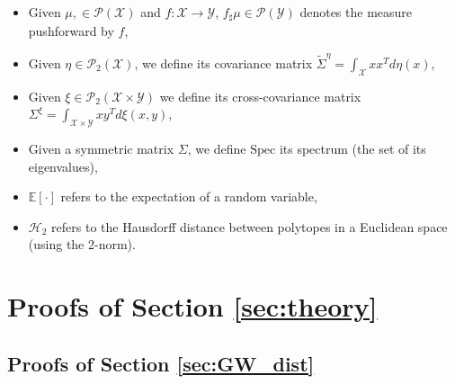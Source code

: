 \documentclass{article}
\newcommand{\Y}{\mathcal{Y}}
\newcommand{\X}{\mathcal{X}}
\newcommand{\1}{\mathbf{1}}
\renewcommand{\P}{\mathcal{P}}
\theoremstyle{definition}
\theoremstyle{remark}
\begin{document}
\begin{appendices}
\begin{itemize}
    \item Given $\mu,\in\P(\X)$ and $f:\X\to\Y$, $f_\sharp\mu\in \P(\Y)$ denotes the measure pushforward by $f$,
    \item Given $\eta\in \P_2(\X)$, we define its covariance matrix $\tilde{\Sigma}^\eta = \int_{\X}xx^Td\eta(x)$, 
    \item Given $\xi\in \P_2(\X\times\Y)$  we define its cross-covariance matrix $\Sigma^\xi=\int_{\X\times \Y}xy^Td\xi(x,y)$,
    \item Given a symmetric matrix $\Sigma$, we define $\mathrm{Spec}$ its spectrum (the set of its eigenvalues),
    \item $\mathbb{E}[\cdot]$ refers to the expectation of a random variable,
    \item $\mathcal{H}_2$ refers to the Hausdorff distance between polytopes in a Euclidean space (using the 2-norm).
    
\end{itemize}
\clearpage

\section{Proofs of Section \ref{sec:theory}}\label{sec:supp_theory_gw}
\subsection{Proofs of Section \ref{sec:GW_dist}}

\end{appendices}
\end{document}
